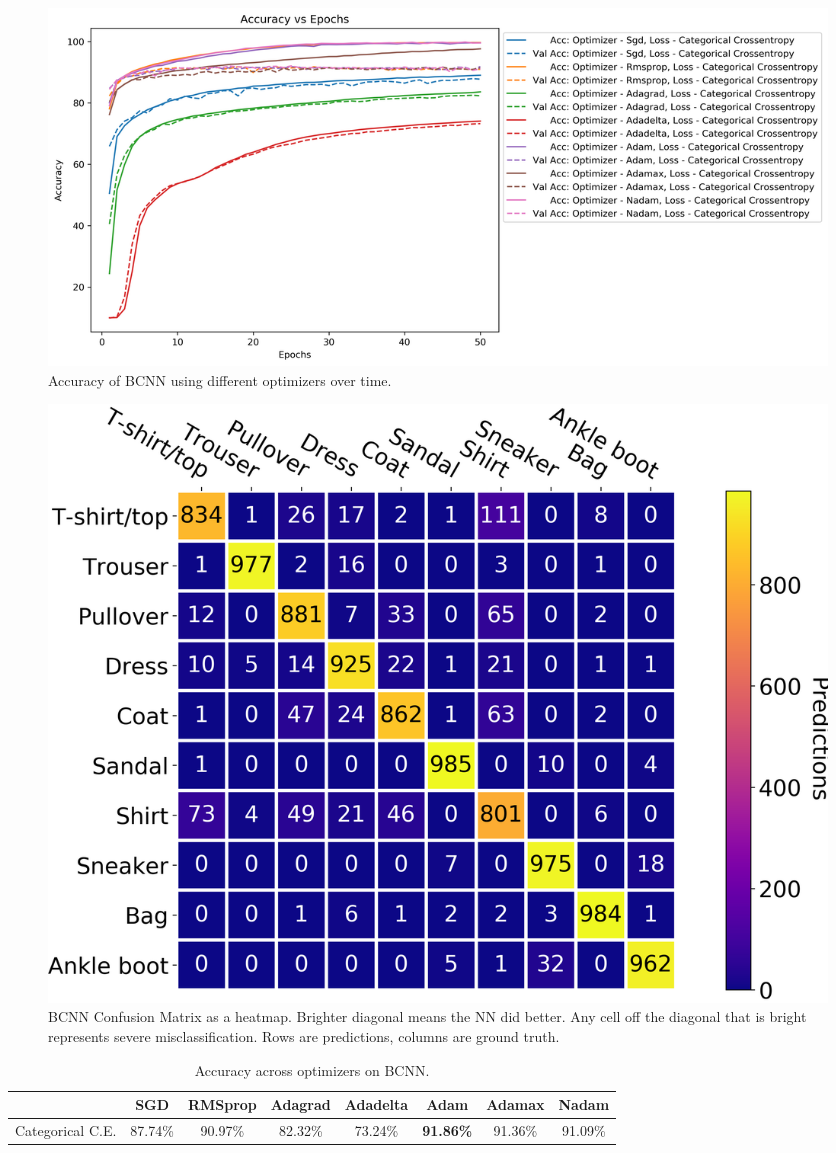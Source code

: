 \documentclass[12pt]{article}
\begin{document}
\begin{figure}
  \centering
  \includegraphics[width=\linewidth]{task_3_acc_epochs.png}
  \caption{Accuracy of BCNN using different optimizers over time.}
  \label{fig:task_3_acc_epochs}
\end{figure}

\begin{figure}
  \centering
  \includegraphics[width=\linewidth]{task_3_cm.png}
  \caption{BCNN Confusion Matrix as a heatmap. Brighter diagonal means the NN did better. Any cell off
   the diagonal that is bright represents severe misclassification. Rows are predictions, columns are ground truth.}
  \label{fig:task_3_cm}
\end{figure}

\begin{table}[]
  \centering
  \caption{Accuracy across optimizers on BCNN.}
  \label{tab:BCNN}
  \begin{tabular}{|c|c|c|c|c|c|c|c|}
  \hline
   & SGD & RMSprop & Adagrad & Adadelta & Adam & Adamax & Nadam \\ \hline
  Categorical C.E. & 87.74\% & 90.97\% & 82.32\% & 73.24\% & \textbf{91.86\%} & 91.36\% & 91.09\% \\ \hline
  \end{tabular}
  \end{table}
\end{document}
